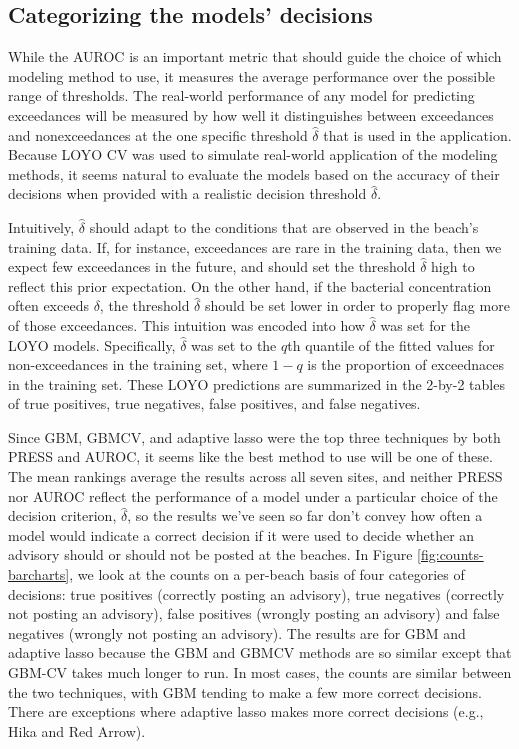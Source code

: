 \documentclass{article}\usepackage[]{graphicx}\usepackage[]{color}
\numberwithin{equation}{section}
\numberwithin{figure}{section}
\renewcommand\[{\begin{equation}}
\renewcommand\]{\end{equation}}
\begin{document}
\subsection{Categorizing the models' decisions}

While the AUROC is an important metric that should guide the choice
of which modeling method to use, it measures the average performance
over the possible range of thresholds. The real-world performance
of any model for predicting exceedances will be measured by how well
it distinguishes between exceedances and nonexceedances at the one
specific threshold $\hat{\delta}$ that is used in the application.
Because LOYO CV was used to simulate real-world application of the
modeling methods, it seems natural to evaluate the models based on
the accuracy of their decisions when provided with a realistic decision
threshold $\hat{\delta}$.

Intuitively, $\hat{\delta}$ should adapt to the conditions that are
observed in the beach's training data. If, for instance, exceedances
are rare in the training data, then we expect few exceedances in the
future, and should set the threshold $\hat{\delta}$ high to reflect
this prior expectation. On the other hand, if the bacterial concentration
often exceeds $\delta$, the threshold $\hat{\delta}$ should be set
lower in order to properly flag more of those exceedances. This intuition
was encoded into how $\hat{\delta}$ was set for the LOYO models.
Specifically, $\hat{\delta}$ was set to the $q$th quantile of the
fitted values for non-exceedances in the training set, where $1-q$
is the proportion of exceednaces in the training set. These LOYO predictions
are summarized in the 2-by-2 tables of true positives, true negatives,
false positives, and false negatives.

Since GBM, GBMCV, and adaptive lasso were the top three techniques
by both PRESS and AUROC, it seems like the best method to use will
be one of these. The mean rankings average the results across all
seven sites, and neither PRESS nor AUROC reflect the performance of
a model under a particular choice of the decision criterion, $\hat{\delta}$,
so the results we've seen so far don't convey how often a model would
indicate a correct decision if it were used to decide whether an advisory
should or should not be posted at the beaches. In Figure \ref{fig:counts-barcharts},
we look at the counts on a per-beach basis of four categories of decisions:
true positives (correctly posting an advisory), true negatives (correctly
not posting an advisory), false positives (wrongly posting an advisory)
and false negatives (wrongly not posting an advisory). The results
are for GBM and adaptive lasso because the GBM and GBMCV methods are
so similar except that GBM-CV takes much longer to run. In most cases,
the counts are similar between the two techniques, with GBM tending
to make a few more correct decisions. There are exceptions where adaptive
lasso makes more correct decisions (e.g., Hika and Red Arrow).
\end{document}
